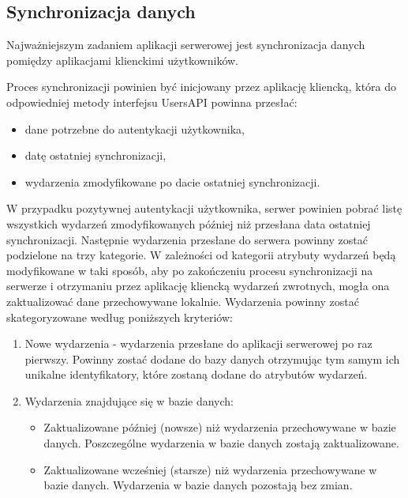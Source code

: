 \subsection{Synchronizacja danych}
\label{synDanych}

Najważniejszym zadaniem aplikacji serwerowej jest synchronizacja danych pomiędzy aplikacjami klienckimi użytkowników.

Proces synchronizacji powinien być inicjowany przez aplikację kliencką, która do odpowiedniej metody interfejsu UsersAPI powinna przesłać:

\begin{itemize}
\item dane potrzebne do autentykacji użytkownika,
\item datę ostatniej synchronizacji,
\item wydarzenia zmodyfikowane po dacie ostatniej synchronizacji.
\end{itemize}

W przypadku pozytywnej autentykacji użytkownika, serwer powinien pobrać listę wszystkich wydarzeń zmodyfikowanych później niż przesłana data ostatniej synchronizacji. Następnie wydarzenia przesłane do serwera powinny zostać podzielone na trzy kategorie. W zależności od kategorii atrybuty wydarzeń będą modyfikowane w taki sposób, aby po zakończeniu procesu synchronizacji na serwerze i otrzymaniu przez aplikację kliencką wydarzeń zwrotnych, mogła ona zaktualizować dane przechowywane lokalnie. Wydarzenia powinny zostać skategoryzowane według poniższych kryteriów:

\begin{enumerate}
  \item Nowe wydarzenia - wydarzenia przesłane do aplikacji serwerowej po raz pierwszy. Powinny zostać dodane do bazy danych otrzymując tym samym ich unikalne identyfikatory, które zostaną dodane do atrybutów wydarzeń.
  \item Wydarzenia znajdujące się w bazie danych:
  \begin{itemize}
    \item Zaktualizowane później (nowsze) niż wydarzenia przechowywane w bazie danych. Poszczególne wydarzenia w bazie danych zostają zaktualizowane.
    \item Zaktualizowane wcześniej (starsze) niż wydarzenia przechowywane w bazie danych. Wydarzenia w bazie danych pozostają bez zmian.
  \end{itemize}
\end{enumerate}

